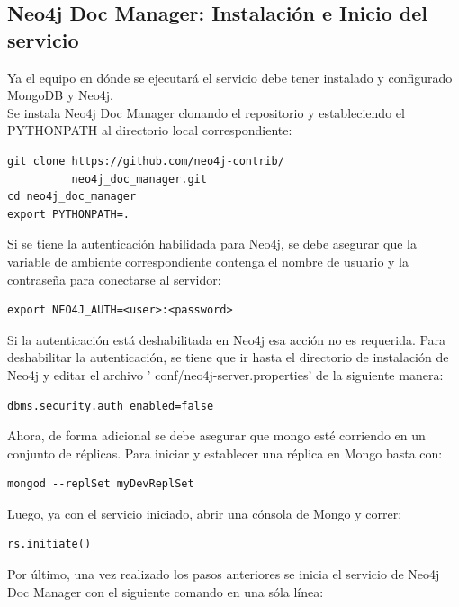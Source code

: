 \documentclass[conference]{IEEEtran}
\begin{document}
\subsection*{Neo4j Doc Manager: Instalaci\'on e Inicio del servicio}

Ya el equipo en d\'onde se ejecutar\'a el servicio debe tener instalado y configurado MongoDB y Neo4j.\\
Se instala Neo4j Doc Manager clonando el repositorio y estableciendo el PYTHONPATH al directorio local correspondiente:

\begin{lstlisting}
git clone https://github.com/neo4j-contrib/
          neo4j_doc_manager.git
cd neo4j_doc_manager
export PYTHONPATH=.
\end{lstlisting}

Si se tiene la autenticaci\'on habilidada para Neo4j, se debe asegurar que la variable de ambiente  correspondiente contenga el nombre de usuario y la contraseña para conectarse al servidor:

\begin{lstlisting}
export NEO4J_AUTH=<user>:<password>
\end{lstlisting}

Si la autenticaci\'on est\'a deshabilitada en Neo4j esa acci\'on no es requerida. Para deshabilitar la autenticación, se tiene que ir hasta el directorio de instalaci\'on de Neo4j y editar el archivo ' conf/neo4j-server.properties'  de la siguiente manera:

\begin{lstlisting}
dbms.security.auth_enabled=false
\end{lstlisting}

Ahora, de forma adicional se debe asegurar que mongo est\'e corriendo en un conjunto de r\'eplicas. Para iniciar y establecer una réplica en Mongo basta con:

\begin{lstlisting}
mongod --replSet myDevReplSet
\end{lstlisting}

Luego, ya con el servicio iniciado, abrir una c\'onsola de Mongo y correr:

\begin{lstlisting}
rs.initiate()
\end{lstlisting}

Por \'ultimo, una vez realizado los pasos anteriores se inicia el servicio de Neo4j Doc Manager con el siguiente comando en una s\'ola l\'inea:
\end{document}
